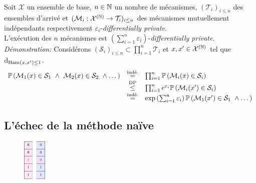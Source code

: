 \label{compo}\\
Soit \(\mathcal X\) un ensemble de base, \(n \in \mathbb{N}\) un nombre de mécanismes, \((\mathcal T_i)_{i \leq n}\) des ensembles d'arrivé et \((\mathcal M_i : \mathcal X^{(\mathbb{N})} \to \mathcal T_i)_{i \leq n}\) des mécanismes mutuellement indépendants respectivement \(\varepsilon_i\)-\textit{differentially private}.\\

L’exécution des \(n\) mécanismes est \(\left(\sum\limits_{i = 1}^n \varepsilon_i\right)\)-\textit{differentially private}.\\

\textit{Démonstration:} Considérons \((\mathcal S_i)_{i \leq n} \subset \prod_{i = 1}^n \mathcal T_i\) et \(x, x' \in \mathcal X^{(\mathbb{N})}\) tel que \(\mathrm{d}_{\text{Ham}(x,x') \leq 1}\).\\

\[
    \begin{array}[]{rcl}
        \mathbb P\left(\mathcal M_1(x) \in \mathcal S_1 \ \wedge \ \mathcal M_2(x) \in \mathcal S_2 \ \wedge \dots \right) & \overset{\text{indé.}}{=} & \prod_{i = 1}^n \mathbb P\left(\mathcal M_i(x) \in \mathcal S_i \right)\\
        & \overset{\text{DP}}{\leq} & \prod_{i = 1}^n e^{\varepsilon_i}\mathbb P\left(\mathcal M_i(x') \in \mathcal S_i \right)\\
        & \overset{\text{indé.}}{=} & \exp\left( \sum_{i = 1}^n \varepsilon_i \right)\mathbb P\left(\mathcal M_1(x') \in \mathcal S_1 \ \wedge \dots \right)
    \end{array}
\]

\subsection{L'échec de la méthode naïve}

\begin{figure}
    \centering
    \includegraphics[width=0.10\textwidth, clip]{"./proofs/fig7.pdf"}
\end{figure}

